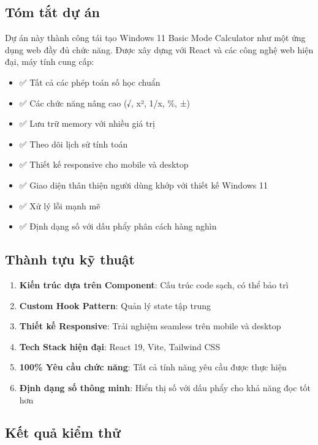 \subsection{Tóm tắt dự án}

Dự án này thành công tái tạo Windows 11 Basic Mode Calculator như một ứng dụng web đầy đủ chức năng. Được xây dựng với React và các công nghệ web hiện đại, máy tính cung cấp:

\begin{itemize}
    \item ✅ Tất cả các phép toán số học chuẩn
    \item ✅ Các chức năng nâng cao (√, x², 1/x, \%, ±)
    \item ✅ Lưu trữ memory với nhiều giá trị
    \item ✅ Theo dõi lịch sử tính toán
    \item ✅ Thiết kế responsive cho mobile và desktop
    \item ✅ Giao diện thân thiện người dùng khớp với thiết kế Windows 11
    \item ✅ Xử lý lỗi mạnh mẽ
    \item ✅ Định dạng số với dấu phẩy phân cách hàng nghìn
\end{itemize}

\subsection{Thành tựu kỹ thuật}

\begin{enumerate}
    \item \textbf{Kiến trúc dựa trên Component}: Cấu trúc code sạch, có thể bảo trì
    \item \textbf{Custom Hook Pattern}: Quản lý state tập trung
    \item \textbf{Thiết kế Responsive}: Trải nghiệm seamless trên mobile và desktop
    \item \textbf{Tech Stack hiện đại}: React 19, Vite, Tailwind CSS
    \item \textbf{100\% Yêu cầu chức năng}: Tất cả tính năng yêu cầu được thực hiện
    \item \textbf{Định dạng số thông minh}: Hiển thị số với dấu phẩy cho khả năng đọc tốt hơn
\end{enumerate}

\subsection{Kết quả kiểm thử}


